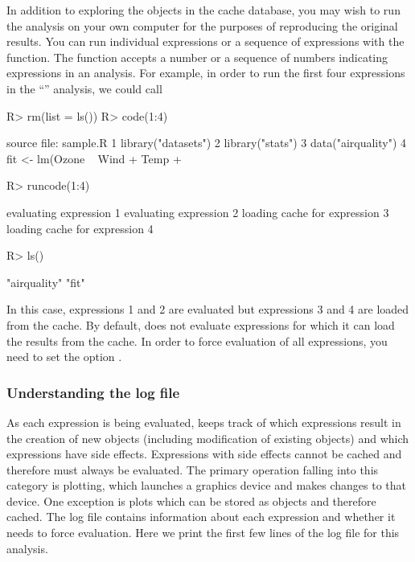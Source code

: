 \documentclass[nojss]{jss}
\begin{document}
In addition to exploring the objects in the cache database, you may
wish to run the analysis on your own computer for the purposes of
reproducing the original results.  You can run individual expressions
or a sequence of expressions with the  function.  The
 function accepts a number or a sequence of numbers
indicating expressions in an analysis.  For example, in order to run
the first four expressions in the ``'' analysis, we could call
\begin{Schunk}
\begin{Sinput}
R> rm(list = ls())
R> code(1:4)
\end{Sinput}
\begin{Soutput}
source file: sample.R
1  library("datasets")
2  library("stats")
3  data("airquality")
4  fit <- lm(Ozone ~ Wind + Temp + 
\end{Soutput}
\begin{Sinput}
R> runcode(1:4)
\end{Sinput}
\begin{Soutput}
evaluating expression 1
evaluating expression 2
loading cache for expression 3
loading cache for expression 4
\end{Soutput}
\begin{Sinput}
R> ls()
\end{Sinput}
\begin{Soutput}
[1] "airquality" "fit"       
\end{Soutput}
\end{Schunk}
In this case, expressions 1 and 2 are evaluated but expressions 3
and 4 are loaded from the cache.  By default,  does not
evaluate expressions for which it can load the results from the cache.
In order to force evaluation of all expressions, you need to set the
option .



\subsubsection{Understanding the log file}
\label{sec:logfile}

As each expression is being evaluated,  keeps track of
which expressions result in the creation of new objects (including
modification of existing objects) and which expressions have side
effects.  Expressions with side effects cannot be cached and therefore
must always be evaluated.  The primary operation falling into this
category is plotting, which launches a graphics device and makes
changes to that device.  One exception is  plots which
can be stored as objects and therefore cached.  The log file contains
information about each expression and whether it needs to force
evaluation.  Here we print the first few lines of the log file for
this analysis.
\end{document}

